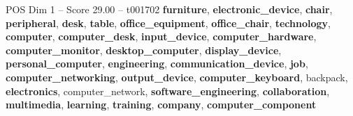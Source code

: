 \begin{textsample}{POS Dim 1 – Score 29.00 – t001702}  \label{ex:f1_pos_017}
\textbf{furniture}, \textbf{electronic\_device}, \textbf{chair}, \textbf{peripheral}, \textbf{desk}, \textbf{table}, \textbf{office\_equipment}, \textbf{office\_chair}, \textbf{technology}, \textbf{computer}, \textbf{computer\_desk}, \textbf{input\_device}, \textbf{computer\_hardware}, \textbf{computer\_monitor}, \textbf{desktop\_computer}, \textbf{display\_device}, \textbf{personal\_computer}, \textbf{engineering}, \textbf{communication\_device}, \textbf{job}, \textbf{computer\_networking}, \textbf{output\_device}, \textbf{computer\_keyboard}, backpack, \textbf{electronics}, computer\_network, \textbf{software\_engineering}, \textbf{collaboration}, \textbf{multimedia}, \textbf{learning}, \textbf{training}, \textbf{company}, \textbf{computer\_component}

\end{textsample}
